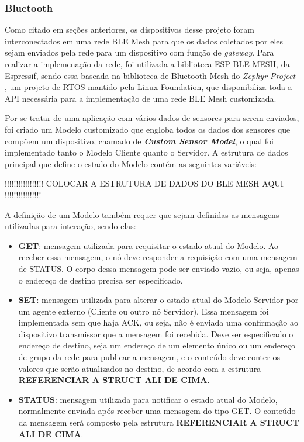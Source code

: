 \documentclass[../monografia.tex]{subfiles}
\begin{document}
\subsubsection{Bluetooth}

Como citado em seções anteriores, os dispositivos desse projeto foram interconectados em uma rede BLE Mesh para que os dados coletados por eles sejam enviados pela rede para um dispositivo com função de \textit{gateway}. Para realizar a implemenação da rede, foi utilizada a biblioteca ESP-BLE-MESH, da Espressif, sendo essa baseada na biblioteca de Bluetooth Mesh do \textit{Zephyr Project} \cite{zephyrproject}, um projeto de RTOS mantido pela Linux Foundation, que disponibiliza toda a API necessária para a implementação de uma rede BLE Mesh customizada.

Por se tratar de uma aplicação com vários dados de sensores para serem enviados, foi criado um Modelo customizado que engloba todos os dados dos sensores que compõem um dispositivo, chamado de \textit{\textbf{Custom Sensor Model}}, o qual foi implementado tanto o Modelo Cliente quanto o Servidor. A estrutura de dados principal que define o estado do Modelo contém as seguintes variáveis: 

!!!!!!!!!!!!!!!!! COLOCAR A ESTRUTURA DE DADOS DO BLE MESH AQUI !!!!!!!!!!!!!!!!

A definição de um Modelo também requer que sejam definidas as mensagens utilizadas para interação, sendo elas:

\begin{itemize}
	\item \textbf{GET}: mensagem utilizada para requisitar o estado atual do Modelo. Ao receber essa mensagem, o nó deve responder a requisição com uma mensagem de STATUS. O corpo dessa mensagem pode ser enviado vazio, ou seja, apenas o endereço de destino precisa ser especificado.
	\item \textbf{SET}: mensagem utilizada para alterar o estado atual do Modelo Servidor por um agente externo (Cliente ou outro nó Servidor). Essa mensagem foi implementada sem que haja ACK, ou seja, não é enviada uma confirmação ao dispositivo transmissor que a mensagem foi recebida. Deve ser especificado o endereço de destino, seja um endereço de um elemento único ou um endereço de grupo da rede para publicar a mensagem, e o conteúdo deve conter os valores que serão atualizados no destino, de acordo com a estrutura \textbf{REFERENCIAR A STRUCT ALI DE CIMA}.
	\item \textbf{STATUS}: mensagem utilizada para notificar o estado atual do Modelo, normalmente enviada após receber uma mensagem do tipo GET. O conteúdo da mensagem será composto pela estrutura \textbf{REFERENCIAR A STRUCT ALI DE CIMA}.
\end{itemize}
\end{document}
